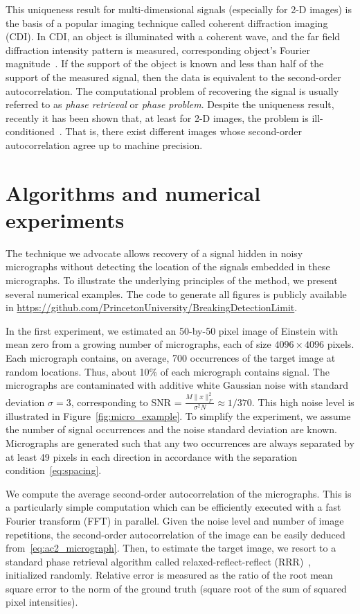 \documentclass[12pt]{article}
\newcommand{\1}{\mathbf{1}}
\theoremstyle{plain}
\theoremstyle{definition}
\theoremstyle{remark}
\theoremstyle{plain}
\theoremstyle{remark}
\theoremstyle{plain}
\theoremstyle{plain}
\theoremstyle{plain}
\numberwithin{equation}{section}
\begin{document}
This uniqueness result for multi-dimensional signals (especially for 2-D images) is the basis of a popular imaging technique called coherent diffraction imaging (CDI). In CDI, an object is
illuminated with a coherent wave, and the far field diffraction
intensity pattern  is measured, corresponding object's Fourier magnitude~\cite{miao1999extending,shechtman2015phase}. 
If the support of the object is known and less than half of the support of the measured signal, then the data is equivalent to the second-order autocorrelation. The computational problem of recovering the signal is usually referred to as \emph{phase retrieval} or \emph{phase problem}.
Despite the uniqueness result, recently it has been shown that, at least for 2-D images, the problem is  ill-conditioned~\cite{barnett2018geometry}. That is, there exist different images whose second-order autocorrelation agree up to machine precision. 



\section{Algorithms and numerical experiments} \label{sec:numerics}

The technique we advocate allows recovery of a signal hidden in noisy micrographs without detecting the location  of the signals embedded in these micrographs. To illustrate the underlying principles of the method, we present several numerical examples. The code to generate all figures is publicly available in \url{https://github.com/PrincetonUniversity/BreakingDetectionLimit}.

In the first experiment, we estimated 
an 50-by-50 pixel image of Einstein with mean zero from a growing number of micrographs, each of size $4096\times 4096$ pixels. Each micrograph contains, on average, 700 occurrences of the target image at random locations. 
Thus, about 10\% of each micrograph contains signal. The micrographs are contaminated with additive white Gaussian noise with standard deviation $\sigma=3$,  corresponding  to SNR = $\frac{M\|x\|_F^2} {\sigma^2N} \approx1/370$. This high noise level is illustrated in Figure~\ref{fig:micro_example}. 
To simplify the experiment, we assume the number of signal occurrences and the noise standard deviation are known. Micrographs are generated such that any two occurrences are always separated by at least 49 pixels in each direction in accordance with the separation condition~\eqref{eq:spacing}. 

We compute the average second-order autocorrelation of the micrographs. This is a particularly simple computation which can be efficiently executed with a fast Fourier transform (FFT) in parallel.  
Given the noise level and number of image repetitions, the second-order autocorrelation of the image can be easily deduced from~\eqref{eq:ac2_micrograph}.  Then, to estimate the target image, we resort to a standard phase retrieval algorithm called relaxed-reflect-reflect (RRR)~\cite{elser2017rrr}, initialized randomly.
Relative error is measured as the ratio of the root mean square error to the norm of the ground truth (square root of the sum of squared pixel intensities).
\end{document}
